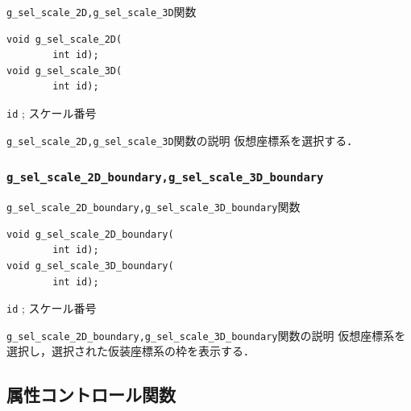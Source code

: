 \documentclass[platex,a4paper,12pt]{jsarticle}%
\begin{document}
\begin{itembox}[l]{\texttt{g\_sel\_scale\_2D,g\_sel\_scale\_3D}関数}
\begin{verbatim}
void g_sel_scale_2D(
        int id);
void g_sel_scale_3D(
        int id);
   \end{verbatim}
\verb|id| ; スケール番号\\
\end{itembox}

\begin{itembox}[l]{\texttt{g\_sel\_scale\_2D,g\_sel\_scale\_3D}関数の説明}
仮想座標系を選択する．
\end{itembox}




\subsubsection{\texttt{g\_sel\_scale\_2D\_boundary,g\_sel\_scale\_3D\_boundary}}

\begin{itembox}[l]{\texttt{g\_sel\_scale\_2D\_boundary,g\_sel\_scale\_3D\_boundary}関数}
\begin{verbatim}
void g_sel_scale_2D_boundary(
        int id);
void g_sel_scale_3D_boundary(
        int id);
   \end{verbatim}
\verb|id| ; スケール番号\\
\end{itembox}

\begin{itembox}[l]{\texttt{g\_sel\_scale\_2D\_boundary,g\_sel\_scale\_3D\_boundary}関数の説明}
仮想座標系を選択し，選択された仮装座標系の枠を表示する．
\end{itembox}




\clearpage
\subsection{属性コントロール関数}

\end{document}
